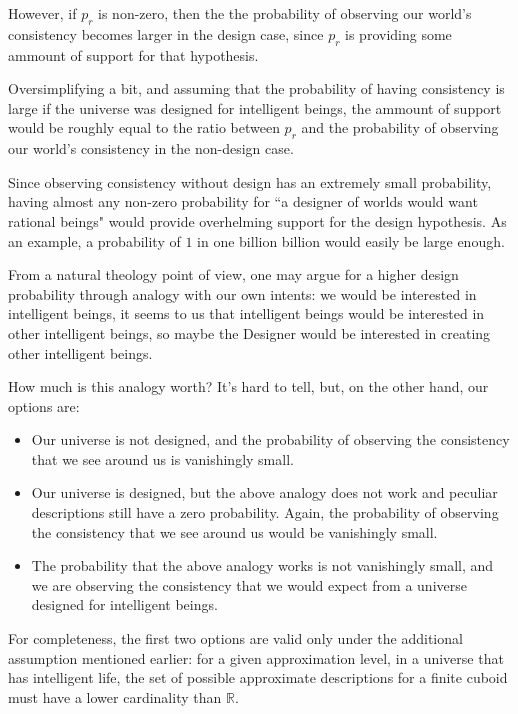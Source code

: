\documentclass[a4paper
]{article}
\def\reale{\mathbb{R}}
\newcommand{\ghilimele}[1]{``#1"}
\begin{document}
However, if $p_r$ is non-zero, then the
the probability of observing our world's consistency becomes larger in the
design case, since $p_r$ is providing some ammount of support for that
hypothesis.

Oversimplifying a bit, and assuming that the probability of having consistency
is large if the universe was designed for intelligent beings,
the ammount of support would
be roughly equal to the ratio between $p_r$ and the probability of observing
our world's consistency in the non-design case.

Since observing consistency without design has an extremely
small probability,
having almost any non-zero probability for
\ghilimele{a designer of worlds would want rational beings} would provide
overhelming support for the design hypothesis.
As an example, a probability
of $1$ in one billion billion would easily be large enough.

From a natural theology point of view, one may argue for a higher design
probability through analogy with our own intents: we would be interested
in intelligent beings, it seems to us that intelligent beings would be
interested in other intelligent beings, so maybe the Designer would be
interested in creating other intelligent beings.

How much is this analogy worth?
It's hard to tell, but, on the other hand, our options are:

\begin{itemize}
  \item Our universe is not designed,
        and the probability of observing the
        consistency that we see around us is vanishingly small.
  \item Our universe is designed, but the above analogy does not work and
        peculiar descriptions still have a zero probability.
        Again, the probability of observing the
        consistency that we see around us would be vanishingly small.
  \item The probability that the above analogy works is not vanishingly small,
        and we are observing the consistency that we would expect from a
        universe designed for intelligent beings.
\end{itemize}
For completeness, the first two options are valid only under the additional
assumption mentioned earlier:
for a given approximation level, in a universe that has intelligent life,
the set of possible approximate descriptions for a finite cuboid
must have a lower cardinality than $\reale$.
\end{document}
